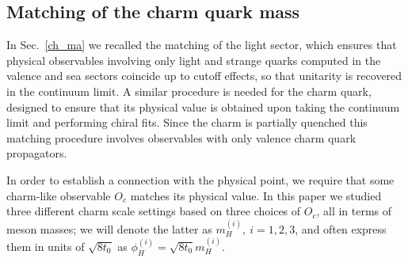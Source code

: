 \subsection{Matching of the charm quark mass}
\label{subsec:matching_charm}
In Sec.~\ref{ch_ma} we recalled the matching of the light sector, which ensures that physical observables involving only light and strange quarks computed in the valence and sea sectors coincide up to cutoff effects, so that unitarity is recovered in the continuum limit.
%
A similar procedure is needed for the charm quark, designed to ensure that its physical value is obtained upon taking the continuum limit and performing chiral fits.
%
Since the charm is partially quenched this matching procedure involves observables with only valence charm quark propagators.
%

%
In order to establish a connection with the physical point, we require that some charm-like observable $O_c$ matches its physical value.
%
In this paper we studied three different charm scale settings based on three choices of $O_c$, all in terms of meson masses; we will denote the latter as $m_H^{(i)},~i=1,2,3$, and often express them in units of $\sqrt{8t_0}$ as $\phi_H^{(i)} = \sqrt{8t_0}m_H^{(i)}$.
%


